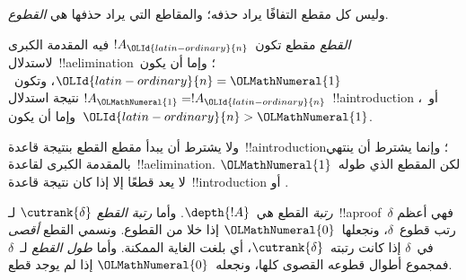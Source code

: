 \documentclass[../../../include/open-logic-section]{subfiles}
\begin{document}
وليس كل مقطع التفافًا يراد حذفه؛ والمقاطع التي يراد حذفها هي
\emph{القطوع}.

\begin{defn}
\emph{القطع} مقطع تكون~$!A_\OLId{latin-ordinary}{n}$ فيه المقدمة الكبرى لاستدلال~!!a{elimination}؛
وإما أن يكون~$\OLId{latin-ordinary}{n}=\OLMathNumeral{1}$، وتكون~$!A_\OLMathNumeral{1}=!A_\OLId{latin-ordinary}{n}$ نتيجة استدلال~!!a{introduction}
أو~\FalseInt، وإما أن يكون~$\OLId{latin-ordinary}{n}>\OLMathNumeral{1}$.
\end{defn}

ولا يشترط أن يبدأ مقطع القطع بنتيجة قاعدة~!!a{introduction}؛ وإنما
يشترط أن ينتهي بالمقدمة الكبرى لقاعدة~!!a{elimination}. لكن المقطع الذي
طوله~$\OLMathNumeral{1}$ لا يعد قطعًا إلا إذا كان نتيجة قاعدة~!!{introduction} أو
\FalseInt.

\begin{defn}
\emph{رتبة} القطع هي~$\depth{!A}$. وأما \emph{رتبة القطع}
$\cutrank{\delta}$ لـ~!!a{proof}~$\delta$ فهي أعظم رتب قطوع~$\delta$،
ونجعلها~$\OLMathNumeral{0}$ إذا خلا من القطوع. ونسمي القطع \emph{أقصى} في~$\delta$ إذا
كانت رتبته~$\cutrank{\delta}$، أي بلغت الغاية الممكنة. وأما
\emph{طول القطع} لـ~$\delta$ فمجموع أطوال قطوعه القصوى كلها، ونجعله~$\OLMathNumeral{0}$
إذا لم يوجد قطع.
\end{defn}
\end{document}

